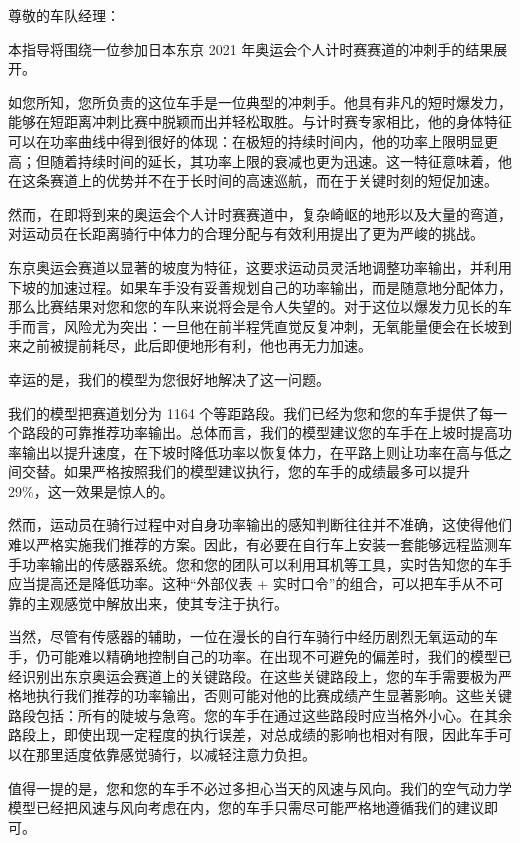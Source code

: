 \documentclass[11pt,a4paper]{ctexart}
\begin{document}
尊敬的车队经理：

本指导将围绕一位参加日本东京 2021 年奥运会个人计时赛赛道的冲刺手的结果展开。

如您所知，您所负责的这位车手是一位典型的冲刺手。他具有非凡的短时爆发力，能够在短距离冲刺比赛中脱颖而出并轻松取胜。与计时赛专家相比，他的身体特征可以在功率曲线中得到很好的体现：在极短的持续时间内，他的功率上限明显更高；但随着持续时间的延长，其功率上限的衰减也更为迅速。这一特征意味着，他在这条赛道上的优势并不在于长时间的高速巡航，而在于关键时刻的短促加速。

然而，在即将到来的奥运会个人计时赛赛道中，复杂崎岖的地形以及大量的弯道，对运动员在长距离骑行中体力的合理分配与有效利用提出了更为严峻的挑战。

东京奥运会赛道以显著的坡度为特征，这要求运动员灵活地调整功率输出，并利用下坡的加速过程。如果车手没有妥善规划自己的功率输出，而是随意地分配体力，那么比赛结果对您和您的车队来说将会是令人失望的。对于这位以爆发力见长的车手而言，风险尤为突出：一旦他在前半程凭直觉反复冲刺，无氧能量便会在长坡到来之前被提前耗尽，此后即便地形有利，他也再无力加速。

幸运的是，我们的模型为您很好地解决了这一问题。

我们的模型把赛道划分为 1164 个等距路段。我们已经为您和您的车手提供了每一个路段的可靠推荐功率输出。总体而言，我们的模型建议您的车手在上坡时提高功率输出以提升速度，在下坡时降低功率以恢复体力，在平路上则让功率在高与低之间交替。如果严格按照我们的模型建议执行，您的车手的成绩最多可以提升 29\%，这一效果是惊人的。

然而，运动员在骑行过程中对自身功率输出的感知判断往往并不准确，这使得他们难以严格实施我们推荐的方案。因此，有必要在自行车上安装一套能够远程监测车手功率输出的传感器系统。您和您的团队可以利用耳机等工具，实时告知您的车手应当提高还是降低功率。这种“外部仪表 + 实时口令”的组合，可以把车手从不可靠的主观感觉中解放出来，使其专注于执行。

当然，尽管有传感器的辅助，一位在漫长的自行车骑行中经历剧烈无氧运动的车手，仍可能难以精确地控制自己的功率。在出现不可避免的偏差时，我们的模型已经识别出东京奥运会赛道上的关键路段。在这些关键路段上，您的车手需要极为严格地执行我们推荐的功率输出，否则可能对他的比赛成绩产生显著影响。这些关键路段包括：所有的陡坡与急弯。您的车手在通过这些路段时应当格外小心。在其余路段上，即使出现一定程度的执行误差，对总成绩的影响也相对有限，因此车手可以在那里适度依靠感觉骑行，以减轻注意力负担。

值得一提的是，您和您的车手不必过多担心当天的风速与风向。我们的空气动力学模型已经把风速与风向考虑在内，您的车手只需尽可能严格地遵循我们的建议即可。
\end{document}
